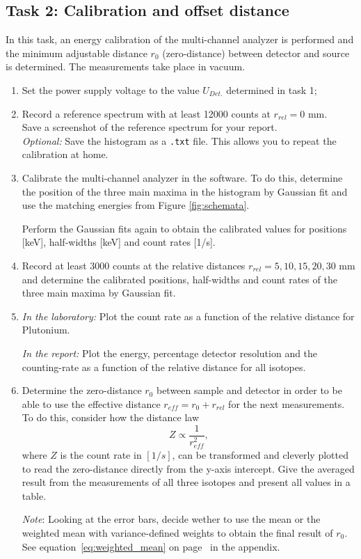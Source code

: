 \subsection{Task 2: Calibration and offset distance}
In this task, an energy calibration of the multi-channel analyzer is performed and the minimum adjustable distance $r_0$ (zero-distance) between detector and source is determined. The measurements take place in vacuum. 

\begin{enumerate}[label=\textbf{\alph*)}]
	\item Set the power supply voltage to the value $U_{Det.}$ determined in task 1;
	\item Record a reference spectrum with at least 12000 counts at $r_{rel} = 0$ mm.
		\\ Save a screenshot of the reference spectrum for your report.
		\\ \textit{Optional: } Save the histogram as a \texttt{.txt} file. This allows you to repeat the calibration at home.
	\item Calibrate the multi-channel analyzer in the software. To do this, determine the position of the three main maxima in the histogram by Gaussian fit and use the matching energies from Figure \ref{fig:schemata}. 
	
	Perform the Gaussian fits again to obtain the calibrated values for positions [keV], half-widths [keV] and count rates [1/s].
	\item Record at least 3000 counts at the relative distances $r_{rel} = 5, 10, 15, 20, 30$ mm and determine the calibrated positions, half-widths and count rates of the three main maxima by Gaussian fit.
	\item \textit{In the laboratory:} Plot the count rate as a function of the relative distance for Plutonium.
	
	\textit{In the report:} Plot the energy, percentage detector resolution and the counting-rate as a function of the relative distance for all isotopes.
	\item Determine the zero-distance $r_0$ between sample and detector in order to be able to use the effective distance $r_{eff} = r_0 + r_{rel}$ for the next measurements. To do this, consider how the distance law
	\begin{equation}
		Z \propto \frac{1}{r^2_{eff}},
	\end{equation}
	where $Z$ is the count rate in $[1/s]$, can be transformed and cleverly plotted to read the zero-distance directly from the y-axis intercept. Give the averaged result from the measurements of all three isotopes and present all values in a table.
 
    \textit{Note}: Looking at the error bars, decide wether to use the mean or the weighted mean with variance-defined weights to obtain the final result of $r_0$. See equation~\eqref{eq:weighted_mean} on page~\pageref{eq:weighted_mean} in the appendix.

\end{enumerate}
%

